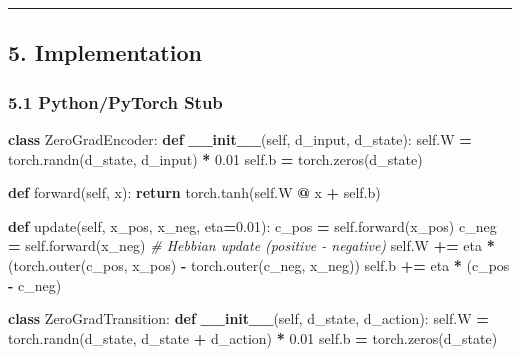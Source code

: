 \documentclass[
  11pt,
  a4paper,
]{article}
\newenvironment{Shaded}{\begin{snugshade}}{\end{snugshade}}
\newcommand{\CommentTok}[1]{\textcolor[rgb]{0.56,0.35,0.01}{\textit{#1}}}
\newcommand{\ControlFlowTok}[1]{\textcolor[rgb]{0.13,0.29,0.53}{\textbf{#1}}}
\newcommand{\FloatTok}[1]{\textcolor[rgb]{0.00,0.00,0.81}{#1}}
\newcommand{\FunctionTok}[1]{\textcolor[rgb]{0.13,0.29,0.53}{\textbf{#1}}}
\newcommand{\KeywordTok}[1]{\textcolor[rgb]{0.13,0.29,0.53}{\textbf{#1}}}
\newcommand{\NormalTok}[1]{#1}
\newcommand{\OperatorTok}[1]{\textcolor[rgb]{0.81,0.36,0.00}{\textbf{#1}}}
\newcommand{\VariableTok}[1]{\textcolor[rgb]{0.00,0.00,0.00}{#1}}
\begin{document}
\begin{center}\rule{0.5\linewidth}{0.5pt}\end{center}

\subsection{5. Implementation}\label{implementation}

\subsubsection{5.1 Python/PyTorch Stub}\label{pythonpytorch-stub}

\begin{Shaded}
\begin{Highlighting}[]
\KeywordTok{class}\NormalTok{ ZeroGradEncoder:}
    \KeywordTok{def} \FunctionTok{\_\_init\_\_}\NormalTok{(}\VariableTok{self}\NormalTok{, d\_input, d\_state):}
        \VariableTok{self}\NormalTok{.W }\OperatorTok{=}\NormalTok{ torch.randn(d\_state, d\_input) }\OperatorTok{*} \FloatTok{0.01}
        \VariableTok{self}\NormalTok{.b }\OperatorTok{=}\NormalTok{ torch.zeros(d\_state)}
    
    \KeywordTok{def}\NormalTok{ forward(}\VariableTok{self}\NormalTok{, x):}
        \ControlFlowTok{return}\NormalTok{ torch.tanh(}\VariableTok{self}\NormalTok{.W }\OperatorTok{@}\NormalTok{ x }\OperatorTok{+} \VariableTok{self}\NormalTok{.b)}
    
    \KeywordTok{def}\NormalTok{ update(}\VariableTok{self}\NormalTok{, x\_pos, x\_neg, eta}\OperatorTok{=}\FloatTok{0.01}\NormalTok{):}
\NormalTok{        c\_pos }\OperatorTok{=} \VariableTok{self}\NormalTok{.forward(x\_pos)}
\NormalTok{        c\_neg }\OperatorTok{=} \VariableTok{self}\NormalTok{.forward(x\_neg)}
        \CommentTok{\# Hebbian update (positive {-} negative)}
        \VariableTok{self}\NormalTok{.W }\OperatorTok{+=}\NormalTok{ eta }\OperatorTok{*}\NormalTok{ (torch.outer(c\_pos, x\_pos) }\OperatorTok{{-}}\NormalTok{ torch.outer(c\_neg, x\_neg))}
        \VariableTok{self}\NormalTok{.b }\OperatorTok{+=}\NormalTok{ eta }\OperatorTok{*}\NormalTok{ (c\_pos }\OperatorTok{{-}}\NormalTok{ c\_neg)}

\KeywordTok{class}\NormalTok{ ZeroGradTransition:}
    \KeywordTok{def} \FunctionTok{\_\_init\_\_}\NormalTok{(}\VariableTok{self}\NormalTok{, d\_state, d\_action):}
        \VariableTok{self}\NormalTok{.W }\OperatorTok{=}\NormalTok{ torch.randn(d\_state, d\_state }\OperatorTok{+}\NormalTok{ d\_action) }\OperatorTok{*} \FloatTok{0.01}
        \VariableTok{self}\NormalTok{.b }\OperatorTok{=}\NormalTok{ torch.zeros(d\_state)}
    

\end{Highlighting}
\end{Shaded}
\end{document}
